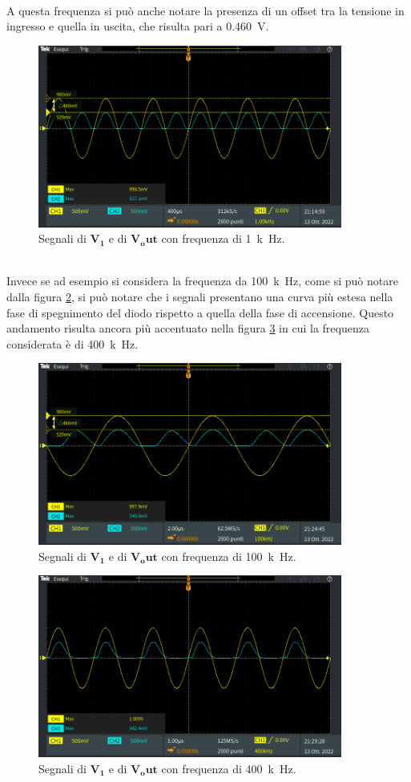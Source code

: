 \documentclass{report}
\begin{document}
\\A questa frequenza si può anche notare la presenza di un offset tra la tensione in ingresso e quella in uscita, che risulta pari a \SI{0.460}{\volt}.
\begin{figure}[h]
	\centering
	\includegraphics[height=6cm]{immagini/TEK00022}
	\caption{Segnali di $\mathbf{V_1}$ e di $\mathbf{V_out}$ con frequenza di \SI{1}{k\hertz}.}
	\label{figura:TEK00022}
\end{figure}
\\Invece se ad esempio si considera la frequenza da \SI{100}{k\hertz}, come si può notare dalla figura \ref{figura:TEK00025}, si può notare che i segnali presentano una curva più estesa nella fase di spegnimento del diodo rispetto a quella della fase di accensione. Questo andamento risulta ancora più accentuato nella figura \ref{figura:TEK00030} in cui la frequenza considerata è di \SI{400}{k\hertz}.
\begin{figure}[h]
	\centering
	\includegraphics[height=6cm]{immagini/TEK00025}
	\caption{Segnali di $\mathbf{V_1}$ e di $\mathbf{V_out}$ con frequenza di \SI{100}{k\hertz}.}
	\label{figura:TEK00025}
\end{figure} 
\begin{figure}[h]
	\centering
	\includegraphics[height=6cm]{immagini/TEK00030}
	\caption{Segnali di $\mathbf{V_1}$ e di $\mathbf{V_out}$ con frequenza di \SI{400}{k\hertz}.}
	\label{figura:TEK00030}
\end{figure} 
\end{document}
